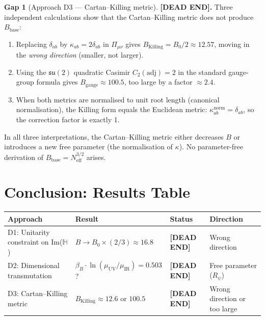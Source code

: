\documentclass[11pt,a4paper]{article}
\theoremstyle{definition}
\newtheorem{gap}{Gap}
\theoremstyle{remark}
\begin{document}
\begin{gap}[Approach D3 — Cartan--Killing metric]
\label{gap:D3}
  \textbf{[DEAD END].}
  Three independent calculations show that the Cartan--Killing metric does not
  produce $B_{\mathrm{base}}$:
  \begin{enumerate}
    \item[(i)] Replacing $\delta_{ab}$ by $\kappa_{ab} = 2\delta_{ab}$ in $\Pi_{\mu\nu}$
      gives $B_{\mathrm{Killing}} = B_0/2 \approx 12.57$, moving in the
      \emph{wrong direction} (smaller, not larger).
    \item[(ii)] Using the $\mathfrak{su}(2)$ quadratic Casimir $C_2(\mathrm{adj})=2$
      in the standard gauge-group formula gives $B_{\mathrm{gauge}} \approx 100.5$,
      too large by a factor $\approx 2.4$.
    \item[(iii)] When both metrics are normalised to unit root length (canonical
      normalisation), the Killing form equals the Euclidean metric:
      $\kappa_{ab}^{\mathrm{norm}} = \delta_{ab}$, so the correction factor is exactly 1.
  \end{enumerate}
  In all three interpretations, the Cartan--Killing metric either decreases $B$
  or introduces a new free parameter (the normalisation of $\kappa$).
  No parameter-free derivation of $B_{\mathrm{base}} = N_{\mathrm{eff}}^{3/2}$ arises.
\end{gap}

\section{Conclusion: Results Table}
\label{sec:conclusion}

\begin{center}
\begin{tabular}{llll}
  \hline
  Approach & Result & Status & Direction \\
  \hline
  D1: Unitarity constraint on Im($\mathbb{H}$)
    & $B \to B_0 \times (2/3) \approx 16.8$
    & \textbf{[DEAD END]}
    & Wrong direction \\
  D2: Dimensional transmutation
    & $\beta_B \cdot \ln(\mu_{\mathrm{UV}}/\mu_{\mathrm{IR}}) = 0.503$?
    & \textbf{[DEAD END]}
    & Free parameter ($R_\psi$) \\
  D3: Cartan--Killing metric
    & $B_{\mathrm{Killing}} \approx 12.6$ or $100.5$
    & \textbf{[DEAD END]}
    & Wrong direction or too large \\
  \hline
\end{tabular}
\end{center}
\end{document}
